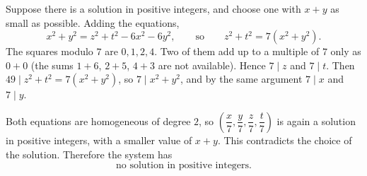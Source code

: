 Suppose there is a solution in positive integers, and choose one with $x+y$ as small as possible. Adding the equations,
\[
x^2+y^2=z^2+t^2-6x^2-6y^2,\qquad\text{so}\qquad z^2+t^2=7\left(x^2+y^2\right).
\]
The squares modulo $7$ are $0,1,2,4$. Two of them add up to a multiple of $7$ only as $0+0$ (the sums $1+6$, $2+5$, $4+3$ are not available). Hence $7\mid z$ and $7\mid t$. Then $49\mid z^2+t^2=7(x^2+y^2)$, so $7\mid x^2+y^2$, and by the same argument $7\mid x$ and $7\mid y$.

Both equations are homogeneous of degree $2$, so $\left(\dfrac {x}{7},\dfrac {y}{7},\dfrac {z}{7},\dfrac {t}{7}\right)$ is again a solution in positive integers, with a smaller value of $x+y$. This contradicts the choice of the solution. Therefore the system has
\[
\boxed{\text{no solution in positive integers}}.
\]
